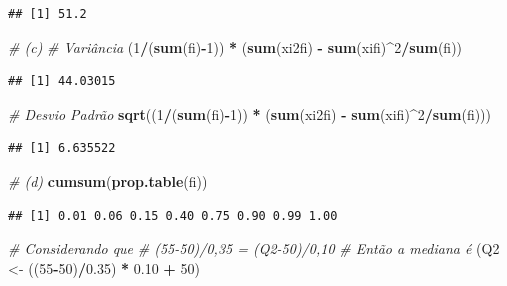 \documentclass[]{article}
\newenvironment{Shaded}{\begin{snugshade}}{\end{snugshade}}
\newcommand{\KeywordTok}[1]{\textcolor[rgb]{0.13,0.29,0.53}{\textbf{#1}}}
\newcommand{\DecValTok}[1]{\textcolor[rgb]{0.00,0.00,0.81}{#1}}
\newcommand{\FloatTok}[1]{\textcolor[rgb]{0.00,0.00,0.81}{#1}}
\newcommand{\StringTok}[1]{\textcolor[rgb]{0.31,0.60,0.02}{#1}}
\newcommand{\CommentTok}[1]{\textcolor[rgb]{0.56,0.35,0.01}{\textit{#1}}}
\newcommand{\OperatorTok}[1]{\textcolor[rgb]{0.81,0.36,0.00}{\textbf{#1}}}
\newcommand{\NormalTok}[1]{#1}
\begin{document}
\begin{verbatim}
## [1] 51.2
\end{verbatim}

\begin{Shaded}
\begin{Highlighting}[]
\CommentTok{# (c)}
\CommentTok{# Variância}
\NormalTok{(}\DecValTok{1}\OperatorTok{/}\NormalTok{(}\KeywordTok{sum}\NormalTok{(fi)}\OperatorTok{-}\DecValTok{1}\NormalTok{)) }\OperatorTok{*}\StringTok{ }\NormalTok{(}\KeywordTok{sum}\NormalTok{(xi2fi) }\OperatorTok{-}\StringTok{ }\KeywordTok{sum}\NormalTok{(xifi)}\OperatorTok{^}\DecValTok{2}\OperatorTok{/}\KeywordTok{sum}\NormalTok{(fi))}
\end{Highlighting}
\end{Shaded}

\begin{verbatim}
## [1] 44.03015
\end{verbatim}

\begin{Shaded}
\begin{Highlighting}[]
\CommentTok{# Desvio Padrão}
\KeywordTok{sqrt}\NormalTok{((}\DecValTok{1}\OperatorTok{/}\NormalTok{(}\KeywordTok{sum}\NormalTok{(fi)}\OperatorTok{-}\DecValTok{1}\NormalTok{)) }\OperatorTok{*}\StringTok{ }\NormalTok{(}\KeywordTok{sum}\NormalTok{(xi2fi) }\OperatorTok{-}\StringTok{ }\KeywordTok{sum}\NormalTok{(xifi)}\OperatorTok{^}\DecValTok{2}\OperatorTok{/}\KeywordTok{sum}\NormalTok{(fi)))}
\end{Highlighting}
\end{Shaded}

\begin{verbatim}
## [1] 6.635522
\end{verbatim}

\begin{Shaded}
\begin{Highlighting}[]
\CommentTok{# (d)}
\KeywordTok{cumsum}\NormalTok{(}\KeywordTok{prop.table}\NormalTok{(fi))}
\end{Highlighting}
\end{Shaded}

\begin{verbatim}
## [1] 0.01 0.06 0.15 0.40 0.75 0.90 0.99 1.00
\end{verbatim}

\begin{Shaded}
\begin{Highlighting}[]
\CommentTok{# Considerando que}
\CommentTok{# (55-50)/0,35 = (Q2-50)/0,10}
\CommentTok{# Então a mediana é}
\NormalTok{(Q2 <-}\StringTok{ }\NormalTok{((}\DecValTok{55}\OperatorTok{-}\DecValTok{50}\NormalTok{)}\OperatorTok{/}\FloatTok{0.35}\NormalTok{) }\OperatorTok{*}\StringTok{ }\FloatTok{0.10} \OperatorTok{+}\StringTok{ }\DecValTok{50}\NormalTok{)}
\end{Highlighting}
\end{Shaded}
\end{document}
